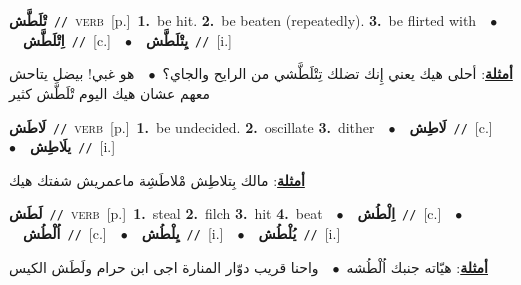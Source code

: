 \documentclass[10pt,a4paper,twoside]{article} %
\begin{document}
\begin{multicols}{2}
{\setlength\topsep{0pt}\textbf{\foreignlanguage{arabic}{تْلَطَّش}}\ {\color{gray}\texttt{//}\color{black}}\ \textsc{verb}\ [p.]\ \textbf{1.}~be hit.  \textbf{2.}~be beaten (repeatedly).  \textbf{3.}~be flirted with\ \ $\bullet$\ \ \setlength\topsep{0pt}\textbf{\foreignlanguage{arabic}{اِتْلَطَّش}}\ {\color{gray}\texttt{//}\color{black}}\ [c.]\ \ $\bullet$\ \ \setlength\topsep{0pt}\textbf{\foreignlanguage{arabic}{يِتْلَطَّش}}\ {\color{gray}\texttt{//}\color{black}}\ [i.]\  \begin{flushright}\color{gray}\foreignlanguage{arabic}{\textbf{\underline{\foreignlanguage{arabic}{أمثلة}}}: أحلى هيك يعني إِنك تضلك تِتْلَطَّشي من الرايح والجاي؟\ $\bullet$\ \  هو غبي! بيضل يتاحش معهم عشان هيك اليوم تْلَطَّش كثير}\end{flushright}\color{black}} \vspace{2mm}

{\setlength\topsep{0pt}\textbf{\foreignlanguage{arabic}{لَاطَش}}\ {\color{gray}\texttt{//}\color{black}}\ \textsc{verb}\ [p.]\ \textbf{1.}~be undecided.  \textbf{2.}~oscillate  \textbf{3.}~dither\ \ $\bullet$\ \ \setlength\topsep{0pt}\textbf{\foreignlanguage{arabic}{لَاطِش}}\ {\color{gray}\texttt{//}\color{black}}\ [c.]\ \ $\bullet$\ \ \setlength\topsep{0pt}\textbf{\foreignlanguage{arabic}{يلَاطِش}}\ {\color{gray}\texttt{//}\color{black}}\ [i.]\  \begin{flushright}\color{gray}\foreignlanguage{arabic}{\textbf{\underline{\foreignlanguage{arabic}{أمثلة}}}: مالك بِتلاطِش مْلاطَشِة ماعمريش شفتك هيك}\end{flushright}\color{black}} \vspace{2mm}

{\setlength\topsep{0pt}\textbf{\foreignlanguage{arabic}{لَطَش}}\ {\color{gray}\texttt{//}\color{black}}\ \textsc{verb}\ [p.]\ \textbf{1.}~steal  \textbf{2.}~filch  \textbf{3.}~hit  \textbf{4.}~beat\ \ $\bullet$\ \ \setlength\topsep{0pt}\textbf{\foreignlanguage{arabic}{اِلْطُش}}\ {\color{gray}\texttt{//}\color{black}}\ [c.]\ \ $\bullet$\ \ \setlength\topsep{0pt}\textbf{\foreignlanguage{arabic}{اُلْطُش}}\ {\color{gray}\texttt{//}\color{black}}\ [c.]\ \ $\bullet$\ \ \setlength\topsep{0pt}\textbf{\foreignlanguage{arabic}{يِلْطُش}}\ {\color{gray}\texttt{//}\color{black}}\ [i.]\ \ $\bullet$\ \ \setlength\topsep{0pt}\textbf{\foreignlanguage{arabic}{يُلْطُش}}\ {\color{gray}\texttt{//}\color{black}}\ [i.]\  \begin{flushright}\color{gray}\foreignlanguage{arabic}{\textbf{\underline{\foreignlanguage{arabic}{أمثلة}}}: هيّاته جنبك اُلْطُشه\ $\bullet$\ \  واحنا قريب دوّار المنارة اجى ابن حرام ولَطَش الكيس}\end{flushright}\color{black}} \vspace{2mm}


\end{multicols}
\end{document}

